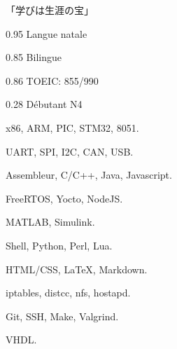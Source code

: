\documentclass{faresume}
\begin{document}
\begin{column}[\rightcolumnwidth]


		\addcontent
		{
			{\Large\begin{CJK}{UTF8}{min}「学びは生涯の宝」\end{CJK}}
		}{}{}{}{}


		{}{}{}{}

		{}{}{}{}

		{}{}{}{}

		{}{}{}{}	


			{0.95}
			{Langue natale}
			{}{}{}

			{0.85}
			{Bilingue}
			{}{}{}

			{0.86}
			{TOEIC: 855/990}
			{}{}{}

			{0.28}
			{D\'ebutant N4}
			{}{}{}


			{x86, ARM, PIC, STM32, 8051.}
			{}{}{}{}

			{UART, SPI, I2C, CAN, USB.}
			{}{}{}{}

			{Assembleur, C/C++, Java, Javascript.}
			{}{}{}{}
        
			{FreeRTOS, Yocto, NodeJS.}
			{}{}{}{}

			{MATLAB, Simulink.}
			{}{}{}{}

			{Shell, Python, Perl, Lua.}
			{}{}{}{}

			{HTML/CSS, {\LaTeX}, Markdown.}
			{}{}{}{}

			{iptables, distcc, nfs, hostapd.}
			{}{}{}{}

			{Git, SSH, Make, Valgrind.}
			{}{}{}{}

			{VHDL.}
			{}{}{}{}



\end{column}
\end{document}
